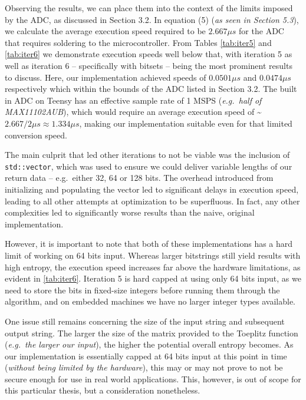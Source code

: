\documentclass{sigchi}
\begin{document}
Observing the results, we can place them into the context of the limits imposed by the ADC, as discussed in Section 3.2. In equation (5) (\emph{as seen in Section 5.3}), we calculate the average execution speed required to be \(2.667 \mu s\) for the ADC that requires soldering to the microcontroller. From Tables \ref{tab:iter5} and \ref{tab:iter6} we demonstrate execution speeds well below that, with iteration 5 as well as iteration 6 -- specifically with bitsets -- being the most prominent results to discuss. Here, our implementation achieved speeds of \(0.0501 \mu s\) and \(0.0474 \mu s\) respectively which within the bounds of the ADC listed in Section 3.2. The built in ADC on Teensy has an effective sample rate of 1 MSPS (\emph{e.g.~half of MAX11102AUB}), which would require an average execution speed of \textasciitilde{}\(2.667/2 \mu s \approx 1.334 \mu s\), making our implementation suitable even for that limited conversion speed.

The main culprit that led other iterations to not be viable was the inclusion of \texttt{std::vector}, which was used to ensure we could deliver variable lengths of our return data -- e.g.~either 32, 64 or 128 bits. The overhead introduced from initializing and populating the vector led to significant delays in execution speed, leading to all other attempts at optimization to be superfluous. In fact, any other complexities led to significantly worse results than the naive, original implementation.

However, it is important to note that both of these implementations has a hard limit of working on 64 bits input. Whereas larger bitstrings still yield results with high entropy, the execution speed increases far above the hardware limitations, as evident in \ref{tab:iter6}. Iteration 5 is hard capped at using only 64 bits input, as we need to store the bits in fixed-size integers before running them through the algorithm, and on embedded machines we have no larger integer types available.

One issue still remains concerning the size of the input string and subsequent output string. The larger the size of the matrix provided to the Toeplitz function (\emph{e.g.~the larger our input}), the higher the potential overall entropy becomes. As our implementation is essentially capped at 64 bits input at this point in time (\emph{without being limited by the hardware}), this may or may not prove to not be secure enough for use in real world applications. This, however, is out of scope for this particular thesis, but a consideration nonetheless.
\end{document}
